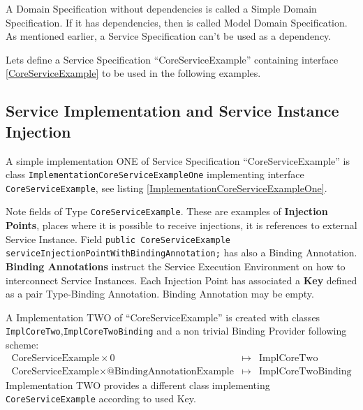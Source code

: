 A Domain Specification without dependencies is called a Simple Domain Specification. If it has dependencies, then is called Model Domain Specification. As mentioned earlier, a Service Specification can't be used as a dependency.



Lets define a Service Specification ``CoreServiceExample'' containing interface \ref{CoreServiceExample} to be used in the following examples.




\subsection{Service Implementation and Service Instance Injection}
\label{sec:ServiceImplementation}

A simple implementation ONE of Service Specification ``CoreServiceExample'' is class \lstinline|ImplementationCoreServiceExampleOne| implementing interface \lstinline|CoreServiceExample|, see listing \ref{ImplementationCoreServiceExampleOne}.



Note fields of Type \lstinline|CoreServiceExample|. These are examples of \textbf{Injection Points}, places where it is possible to receive injections, it is references to external Service Instance. Field \lstinline|public CoreServiceExample serviceInjectionPointWithBindingAnnotation;| has also a Binding Annotation. \textbf{Binding Annotations} instruct the Service Execution Environment on how to interconnect Service Instances. Each Injection Point has associated a \textbf{Key} defined as a pair Type-Binding Annotation. Binding Annotation may be empty.

A Implementation TWO of ``CoreServiceExample'' is created with classes \lstinline|ImplCoreTwo|,\lstinline|ImplCoreTwoBinding| and a non trivial Binding Provider following scheme:
\begin{eqnarray}
\text{CoreServiceExample}\times 0 &\longmapsto& \text{ImplCoreTwo} \nonumber \\
\text{CoreServiceExample}\times\text{@BindingAnnotationExample} &\longmapsto& \text{ImplCoreTwoBinding} \nonumber 
\end{eqnarray}
Implementation TWO provides a different class implementing \lstinline|CoreServiceExample| according to used Key.

